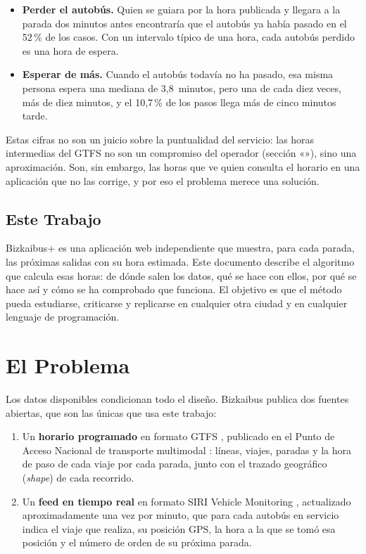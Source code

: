 \begin{itemize}
  \item \textbf{Perder el autobús.} Quien se guiara por la hora publicada y llegara a la parada dos minutos antes
        encontraría que el autobús ya había pasado en el 52\,\% de los casos. Con un intervalo típico de una hora, cada
        autobús perdido es una hora de espera.
  \item \textbf{Esperar de más.} Cuando el autobús todavía no ha pasado, esa misma persona espera una mediana de
        3,8~minutos, pero una de cada diez veces, más de diez minutos, y el 10,7\,\% de los pasos llega más de cinco
        minutos tarde.
\end{itemize}

\noindent Estas cifras no son un juicio sobre la puntualidad del servicio: las horas intermedias del GTFS no son un
compromiso del operador (sección «»), sino una aproximación. Son, sin embargo, las horas que ve quien
consulta el horario en una aplicación que no las corrige, y por eso el problema merece una solución.

\subsection{Este Trabajo}

Bizkaibus+ es una aplicación web independiente que muestra, para cada parada, las próximas salidas con su hora
estimada. Este documento describe el algoritmo que calcula esas horas: de dónde salen los datos, qué se hace con
ellos, por qué se hace así y cómo se ha comprobado que funciona. El objetivo es que el método pueda estudiarse,
criticarse y replicarse en cualquier otra ciudad y en cualquier lenguaje de programación.

\section{El Problema}
\label{sec:problema}

Los datos disponibles condicionan todo el diseño. Bizkaibus publica dos fuentes abiertas, que son las únicas que usa
este trabajo:

\begin{enumerate}
  \item Un \textbf{horario programado} en formato GTFS \citep{gtfs}, publicado en el Punto de Acceso Nacional de
        transporte multimodal \citep{nap}: líneas, viajes, paradas y la hora de paso de cada viaje por cada parada,
        junto con el trazado geográfico (\emph{shape}) de cada recorrido.
  \item Un \textbf{feed en tiempo real} en formato SIRI Vehicle Monitoring \citep{siri}, actualizado aproximadamente
        una vez por minuto, que para cada autobús en servicio indica el viaje que realiza, su posición GPS, la hora a la que se tomó
        esa posición y el número de orden de su próxima parada.
\end{enumerate}


